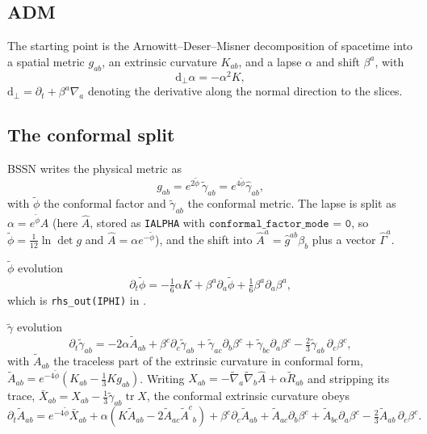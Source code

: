 \documentclass[11pt,openany]{book}
\newcommand{\dd}{\mathrm{d}}
\newcommand{\ph}{\tilde{\phi}}
\newcommand{\At}{\tilde{A}}
\newcommand{\etr}{\tilde{\gamma}}
\DeclareMathOperator{\tr}{tr}
\begin{document}
\subsection{ADM}

The starting point is the Arnowitt--Deser--Misner decomposition of spacetime
into a spatial metric $g_{ab}$, an extrinsic curvature $K_{ab}$, and a lapse
$\alpha$ and shift $\beta^a$, with
\begin{equation}
\label{eq:adm-lapse}
\dd_\perp \alpha = -\alpha^2 K,
\end{equation}
$\dd_\perp = \partial_t + \beta^a \nabla_a$ denoting the derivative along the
normal direction to the slices.

\subsection{The conformal split}

BSSN writes the physical metric as
\begin{equation}
\label{eq:conformal}
g_{ab} = e^{2\ph}\,\etr_{ab} = e^{4\ph}\hat{\gamma}_{ab},
\end{equation}
with $\ph$ the conformal factor and $\etr_{ab}$ the conformal metric. The
lapse is split as $\alpha = e^{\ph} A$ (here $\hat{A}$, stored as
\texttt{IALPHA} with $\texttt{conformal\_factor\_mode = 0}$, so $\ph =
\frac{1}{12}\ln\det g$ and $\hat{A} = \alpha e^{-\ph}$), and the shift into
$\hat{A}^a = \hat{g}^{ab}\beta_b$ plus a vector $\hat{\Gamma}^a$.

$\ph$ evolution
\begin{equation}
\label{eq:ph}
\partial_t\ph = -\tfrac{1}{6}\alpha K + \beta^a \partial_a\ph + \tfrac{1}{6}\beta^a\partial_a\beta^a,
\end{equation}
which is \texttt{rhs\_out(IPHI)} in .

$\etr$ evolution
\begin{equation}
\label{eq:gam}
\partial_t \etr_{ab} = -2\alpha \At_{ab}
  + \beta^c\partial_c\etr_{ab}
  + \etr_{ac}\partial_b\beta^c + \etr_{bc}\partial_a\beta^c
  - \tfrac{2}{3}\etr_{ab}\,\partial_c\beta^c,
\end{equation}
with $\At_{ab}$ the traceless part of the extrinsic curvature in conformal form,
$\At_{ab} = e^{-4\ph}\left(K_{ab} - \tfrac{1}{3}K g_{ab}\right)$. Writing
$X_{ab} = -\tilde{\nabla}_a\tilde{\nabla}_b\hat{A} + \alpha\tilde{R}_{ab}$ and
stripping its trace, $\bar{X}_{ab} = X_{ab} - \tfrac{1}{3}\etr_{ab}\tr X$, the
conformal extrinsic curvature obeys
\begin{equation}
\label{eq:atilde}
\partial_t\At_{ab} = e^{-4\ph}\bar{X}_{ab}
  + \alpha\left(K\At_{ab} - 2\At_{ac}\At^{c}{}_{b}\right)
  + \beta^c\partial_c\At_{ab}
  + \At_{ac}\partial_b\beta^c + \At_{bc}\partial_a\beta^c
  - \tfrac{2}{3}\At_{ab}\,\partial_c\beta^c .
\end{equation}
\end{document}
